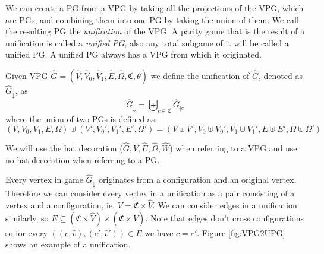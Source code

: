 We can create a PG from a VPG by taking all the projections of the VPG, which are PGs, and combining them into one PG by taking the union of them. We call the resulting PG the \textit{unification} of the VPG. A parity game that is the result of a unification is called a \textit{unified PG}, also any total subgame of it will be called a unified PG. A unified PG always has a VPG from which it originated.
\begin{definition}
Given VPG $\hat{G} = (\hat{V},\hat{V}_0,\hat{V}_1, \hat{E},\hat{\Omega}, \mathfrak{C},\theta)$ we define the unification of $\hat{G}$, denoted as $\hat{G}_{\downarrow}$, as
\[  \hat{G}_{\downarrow} = \biguplus_{c\in \mathfrak{C}}\hat{G}_{|c} \]
where the union of two PGs is defined as
\[ (V,V_0,V_1,E,\Omega) \uplus (V',V_0',V_1',E',\Omega') = (V \uplus V', V_0 \uplus V_0', V_1 \uplus V_1', E \uplus E', \Omega \uplus \Omega') \]
\end{definition}
We will use the hat decoration ($\hat{G},\hat{V},\hat{E},\hat{\Omega},\hat{W}$) when referring to a VPG and use no hat decoration when referring to a PG.

Every vertex in game $\hat{G}_{\downarrow}$ originates from a configuration and an original vertex. Therefore we can consider every vertex in a unification as a pair consisting of a vertex and a configuration, ie. $V = \mathfrak{C} \times \hat{V}$. We can consider edges in a unification similarly, so $E \subseteq (\mathfrak{C} \times \hat{V}) \times (\mathfrak{C} \times \hat{V})$. Note that edges don't cross configurations so for every $((c,\hat{v}) , (c',\hat{v}')) \in E$ we have $c = c'$. Figure \ref{fig:VPG2UPG} shows an example of a unification.

